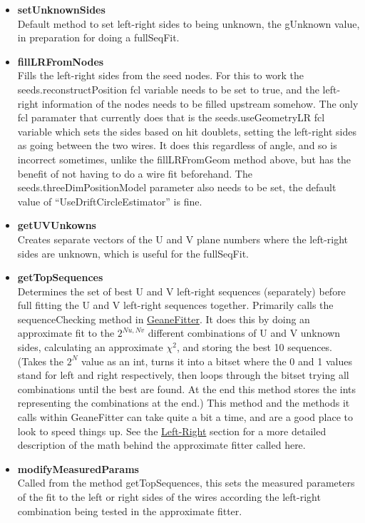 \begin{enumerate}
\begin{itemize}
          \item{\bf{setUnknownSides}} \\ 
          Default method to set left-right sides to being unknown, the gUnknown value, in preparation for doing a fullSeqFit.

          \item{\bf{fillLRFromNodes}} \\ 
          Fills the left-right sides from the seed nodes. For this to work the seeds.reconstructPosition fcl variable needs to be set to true, and the left-right information of the nodes needs to be filled upstream somehow. The only fcl paramater that currently does that is the seeds.useGeometryLR fcl variable which sets the sides based on hit doublets, setting the left-right sides as going between the two wires. It does this regardless of angle, and so is incorrect sometimes, unlike the fillLRFromGeom method above, but has the benefit of not having to do a wire fit beforehand. The seeds.threeDimPositionModel parameter also needs to be set, the default value of ``UseDriftCircleEstimator'' is fine.

          \item{\bf{getUVUnkowns}} \\
          Creates separate vectors of the U and V plane numbers where the left-right sides are unknown, which is useful for the fullSeqFit.

          \item{\bf{getTopSequences}} \\
          Determines the set of best U and V left-right sequences (separately) before full fitting the U and V left-right sequences together. Primarily calls the sequenceChecking method in \hyperref[sec:GeaneFitter]{GeaneFitter}. It does this by doing an approximate fit to the $2^{Nu,Nv}$ different combinations of U and V unknown sides, calculating an approximate $\chi^{2}$, and storing the best 10 sequences. (Takes the $2^{N}$ value as an int, turns it into a bitset where the 0 and 1 values stand for left and right respectively, then loops through the bitset trying all combinations until the best are found. At the end this method stores the ints representing the combinations at the end.) This method and the methods it calls within GeaneFitter can take quite a bit a time, and are a good place to look to speed things up. See the \hyperref[sec:LR]{Left-Right} section for a more detailed description of the math behind the approximate fitter called here.

          \item{\bf{modifyMeasuredParams}} \\
          Called from the method getTopSequences, this sets the measured parameters of the fit to the left or right sides of the wires according the left-right combination being tested in the approximate fitter.


\end{itemize}
\end{enumerate}
